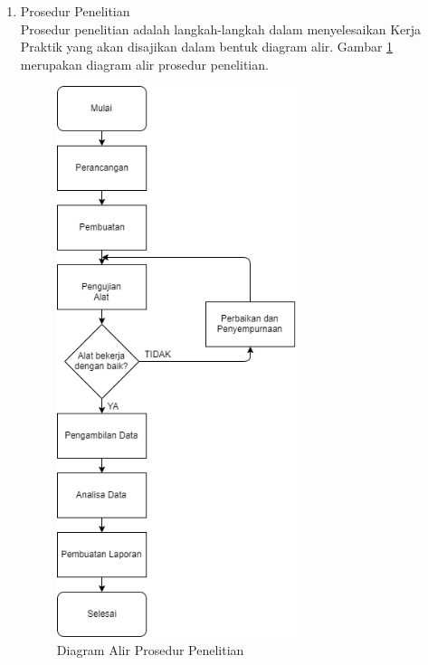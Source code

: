\begin{enumerate}
	\item Prosedur Penelitian\\
	Prosedur penelitian adalah langkah-langkah dalam menyelesaikan Kerja Praktik yang akan disajikan dalam bentuk diagram alir. Gambar \ref{pic.diagramalir} merupakan diagram alir prosedur penelitian.
	
	\begin{figure}[H]
		\centering
		\includegraphics[width=7cm]{gambar/flowchart.png}
		\caption{ Diagram Alir Prosedur Penelitian}
		\label{pic.diagramalir}
	\end{figure}
	
	
\end{enumerate}

